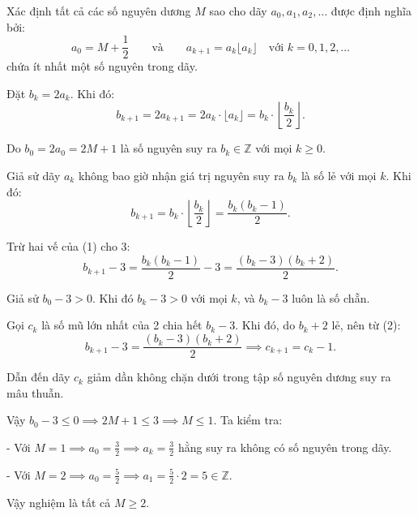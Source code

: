\ifshowproblemandsoln
\ifshowproblem\begin{problem}\label{problem:IMO-2015-SL-P1}\fi
\ifshowsoln\begin{problem}\fi
    Xác định tất cả các số nguyên dương \( M \) sao cho dãy \( a_0, a_1, a_2, \ldots \) được định nghĩa bởi:
    \[
        a_0 = M + \frac{1}{2} \qquad \text{và} \qquad a_{k+1} = a_k \lfloor a_k \rfloor \quad \text{với } k = 0, 1, 2, \ldots
    \]
    chứa ít nhất một số nguyên trong dãy.    
\end{problem}
\fi

\ifshowsoln
\begin{soln}\footnotemark
    Đặt \( b_k = 2a_k \). Khi đó:
    \[
        b_{k+1} = 2a_{k+1} = 2a_k \cdot \lfloor a_k \rfloor = b_k \cdot \left\lfloor \frac{b_k}{2} \right\rfloor.
    \]

    Do \( b_0 = 2a_0 = 2M + 1 \) là số nguyên suy ra \( b_k \in \mathbb{Z} \) với mọi \( k \ge 0 \).

    Giả sử dãy \( a_k \) không bao giờ nhận giá trị nguyên suy ra \( b_k \) là số lẻ với mọi \( k \). Khi đó:
    \[
        b_{k+1} = b_k \cdot \left\lfloor \frac{b_k}{2} \right\rfloor = \frac{b_k(b_k - 1)}{2}. \tag{1}
    \]

    Trừ hai vế của (1) cho 3:
    \[
        b_{k+1} - 3 = \frac{b_k(b_k - 1)}{2} - 3 = \frac{(b_k - 3)(b_k + 2)}{2}. \tag{2}
    \]

    Giả sử \( b_0 - 3 > 0 \). Khi đó \( b_k - 3 > 0 \) với mọi \( k \), và \( b_k - 3 \) luôn là số chẵn.

    Gọi \( c_k \) là số mũ lớn nhất của 2 chia hết \( b_k - 3 \). Khi đó, do \( b_k + 2 \) lẻ, nên từ (2):
    \[
        b_{k+1} - 3 = \frac{(b_k - 3)(b_k + 2)}{2} \implies c_{k+1} = c_k - 1.
    \]

    Dẫn đến dãy \( c_k \) giảm dần không chặn dưới trong tập số nguyên dương suy ra mâu thuẫn.

    Vậy \( b_0 - 3 \le 0 \implies 2M + 1 \le 3 \implies M \le 1 \). Ta kiểm tra:

    - Với \( M = 1 \implies a_0 = \frac{3}{2} \implies a_k = \frac{3}{2} \) hằng suy ra không có số nguyên trong dãy.

    - Với \( M = 2 \implies a_0 = \frac{5}{2} \implies a_1 = \frac{5}{2} \cdot 2 = 5 \in \mathbb{Z} \).

    Vậy nghiệm là tất cả \( M \ge 2 \).
\end{soln}


\end{problem}
